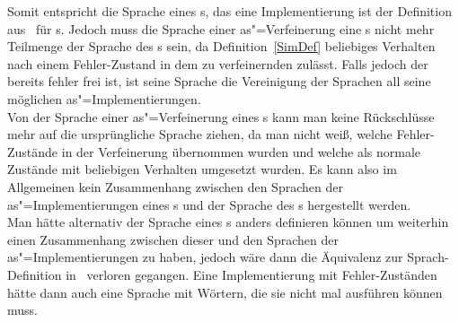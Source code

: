 Somit entspricht die Sprache eines \MEIO{}s, das eine Implementierung ist der
Definition aus~\cite{Schinko2016BA} für \EIO{}s. Jedoch muss die Sprache einer
as"=Verfeinerung eine \MEIO{}s nicht mehr Teilmenge der Sprache des
\MEIO{}s sein, da Definition~\ref{SimDef} beliebiges Verhalten nach einem
Fehler-Zustand in dem zu verfeinernden \MEIO{} zulässt. Falls jedoch der
\MEIO{} bereits fehler frei ist, ist seine Sprache die Vereinigung der Sprachen
all seine möglichen as"=Implementierungen.\\
Von der Sprache einer as"=Verfeinerung eines \MEIO{}s kann man keine
Rückschlüsse mehr auf die ursprüngliche Sprache ziehen, da man nicht weiß,
welche Fehler-Zustände in der Verfeinerung übernommen wurden und welche als
normale Zustände mit beliebigen Verhalten umgesetzt wurden. Es kann also im
Allgemeinen kein Zusammenhang zwischen den Sprachen der as"=Implementierungen
eines \MEIO{}s und der Sprache des \MEIO{}s hergestellt werden.\\
Man hätte alternativ der Sprache eines \MEIO{}s anders definieren können um
weiterhin einen Zusammenhang zwischen dieser und den Sprachen der
as"=Implementierungen zu haben, jedoch wäre dann die Äquivalenz zur \EIO{}
Sprach-Definition in~\cite{Schinko2016BA} verloren gegangen. Eine
Implementierung mit Fehler-Zuständen hätte dann auch eine Sprache mit Wörtern,
die sie nicht mal ausführen können muss.
